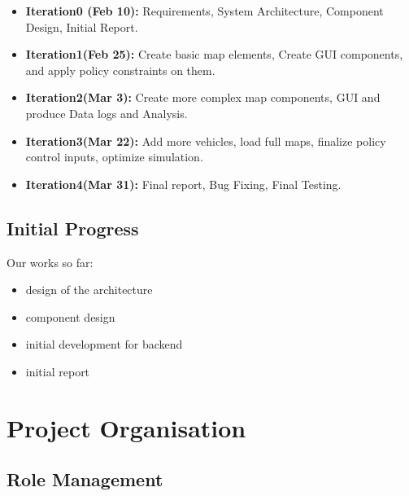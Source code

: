 \documentclass[11pt]{article}
\begin{document}
\begin{itemize}
\item
\textbf{Iteration0 (Feb 10):} Requirements, System Architecture, Component Design, Initial Report.
 \item \textbf{Iteration1(Feb 25):}  Create basic map elements, Create GUI components, and apply policy constraints on them.
 \item \textbf{Iteration2(Mar 3):} Create more complex map components, GUI and produce Data logs and Analysis.
 \item \textbf{Iteration3(Mar 22):} Add more vehicles, load full maps, finalize policy control inputs, optimize simulation.
 \item \textbf{Iteration4(Mar 31):} Final report, Bug Fixing, Final Testing.


\end{itemize}
	
\subsection{Initial Progress}
Our works so far:
\begin{itemize}
	\item design of the architecture
	\item component design
	\item initial development for backend
	\item initial report
\end{itemize}


\section{Project Organisation}

\subsection{Role Management}
\end{document}
